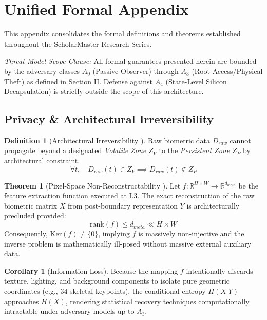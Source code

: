\documentclass[conference]{IEEEtran}
\theoremstyle{definition}
\newtheorem{definition}{Definition}
\newtheorem{theorem}{Theorem}
\newtheorem{corollary}{Corollary}
\begin{document}
\appendices

\section{Unified Formal Appendix}
\label{sec:appendix_theorems}

This appendix consolidates the formal definitions and theorems established throughout the ScholarMaster Research Series.

\textit{Threat Model Scope Clause:} All formal guarantees presented herein are bounded by the adversary classes $A_0$ (Passive Observer) through $A_3$ (Root Access/Physical Theft) as defined in Section II. Defense against $A_4$ (State-Level Silicon Decapsulation) is strictly outside the scope of this architecture.

\subsection{Privacy \& Architectural Irreversibility}

\begin{definition}[Architectural Irreversibility \cite{P3, P17}]
Raw biometric data $D_{raw}$ cannot propagate beyond a designated \textit{Volatile Zone} $Z_V$ to the \textit{Persistent Zone} $Z_P$ by architectural constraint.
\begin{equation}
\forall t, \quad D_{raw}(t) \in Z_V \implies D_{raw}(t) \notin Z_P
\end{equation}
\end{definition}

\begin{theorem}[Pixel-Space Non-Reconstructability \cite{P19}]
Let $f: \mathbb{R}^{H \times W} \to \mathbb{R}^{d_{meta}}$ be the feature extraction function executed at L3. The exact reconstruction of the raw biometric matrix $X$ from post-boundary representation $Y$ is architecturally precluded provided:
\begin{equation}
\text{rank}(f) \le d_{meta} \ll H \times W
\end{equation}
Consequently, $\text{Ker}(f) \neq \{0\}$, implying $f$ is massively non-injective and the inverse problem is mathematically ill-posed without massive external auxiliary data.
\end{theorem}

\begin{corollary}[Information Loss]
Because the mapping $f$ intentionally discards texture, lighting, and background components to isolate pure geometric coordinates (e.g., 34 skeletal keypoints), the conditional entropy $H(X|Y)$ approaches $H(X)$, rendering statistical recovery techniques computationally intractable under adversary models up to $A_3$.
\end{corollary}
\end{document}
